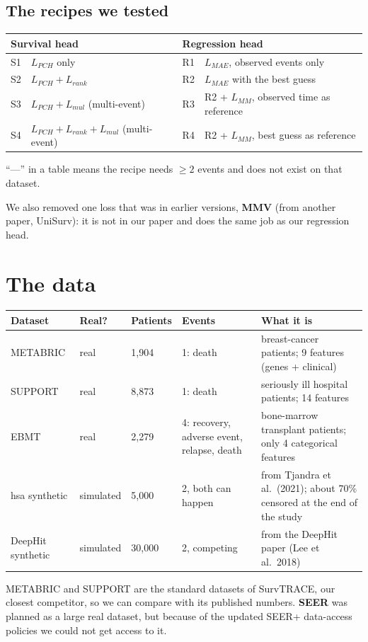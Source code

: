 \documentclass[11pt]{article}
\begin{document}
\subsection{The recipes we tested}
\begin{table}[H]
\centering
\begin{tabular}{ll@{\hspace{2cm}}ll}
\toprule
\multicolumn{2}{l}{Survival head} & \multicolumn{2}{l}{Regression head} \\
\midrule
S1 & $L_{PCH}$ only & R1 & $L_{MAE}$, observed events only \\
S2 & $L_{PCH} + L_{rank}$ & R2 & $L_{MAE}$ with the best guess \\
S3 & $L_{PCH} + L_{mul}$ (multi-event) & R3 & R2 + $L_{MM}$, observed time as reference \\
S4 & $L_{PCH} + L_{rank} + L_{mul}$ (multi-event) & R4 & R2 + $L_{MM}$, best guess as reference \\
\bottomrule
\end{tabular}
\end{table}
``---'' in a table means the recipe needs $\geq 2$ events and does not exist on that dataset.

We also removed one loss that was in earlier versions, \textbf{MMV} (from another paper, UniSurv): it
is not in our paper and does the same job as our regression head.

\section{The data}
\begin{table}[H]
\centering
\begin{tabularx}{\textwidth}{lllp{3.3cm}Y}
\toprule
Dataset & Real? & Patients & Events & What it is \\
\midrule
METABRIC & real & 1,904 & 1: death & breast-cancer patients; 9 features (genes + clinical) \\
SUPPORT & real & 8,873 & 1: death & seriously ill hospital patients; 14 features \\
EBMT & real & 2,279 & 4: recovery, adverse event, relapse, death & bone-marrow transplant patients;
  only 4 categorical features \\
hsa synthetic & simulated & 5,000 & 2, both can happen & from Tjandra et al.\ (2021); about 70\%
  censored at the end of the study \\
DeepHit synthetic & simulated & 30,000 & 2, competing & from the DeepHit paper (Lee et al.\ 2018) \\
\bottomrule
\end{tabularx}
\end{table}
METABRIC and SUPPORT are the standard datasets of SurvTRACE, our closest competitor, so we can compare
with its published numbers. \textbf{SEER} was planned as a large real dataset, but because of the
updated SEER+ data-access policies we could not get access to it.
\end{document}
